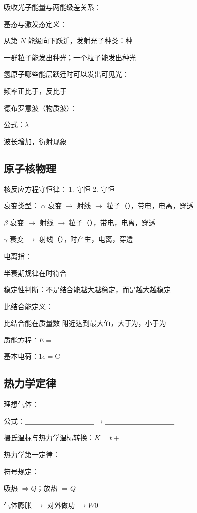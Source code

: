 吸收光子能量与两能级差关系：

基态与激发态定义：

从第 $N$ 能级向下跃迁，发射光子种类：\sbl 种

一群粒子能发出\sbl 种光；一个粒子能发出\sbl 种光

氢原子哪些能层跃迁时可以发出可见光：

频率正比于\sbl ，反比于\sbl

德布罗意波（物质波）：

公式：$\lambda =$\sbl 

波长增加，衍射现象\sbl

\subsection{原子核物理}

核反应方程守恒律：
1. \sbl 守恒
2. \sbl 守恒

衰变类型：
$\alpha$ 衰变 $\rightarrow$ \sbl 射线 $\rightarrow$ \sbl 粒子（\sbl ），带\sbl 电，电离\sbl ，穿透\sbl

$\beta$ 衰变 $\rightarrow$ \sbl 射线 $\rightarrow$ \sbl 粒子（\sbl ），带\sbl 电，电离\sbl ，穿透\sbl

$\gamma$ 衰变 $\rightarrow$ \sbl 射线（\sbl ），\lbl 时产生，电离\sbl ，穿透\sbl

电离指：

半衰期规律在\mbl 时符合


稳定性判断：不是结合能越大越稳定，而是\sbl 越大越稳定

比结合能定义：

比结合能在质量数 \sbl 附近达到最大值，大于为\mbl ，小于为\mbl

质能方程：$E =$\sbl

基本电荷：$1e =$\sbl C

\subsection{热力学定律}

理想气体：

公式：$\xlbl \rightarrow \xlbl$

摄氏温标与热力学温标转换：$K = t + $\sbl

热力学第一定律：

符号规定：

吸热 $\Rightarrow Q $\sbl ；放热 $\Rightarrow Q $\sbl

气体膨胀 $\rightarrow$ 对外做功 $\rightarrow W $\sbl $0$

